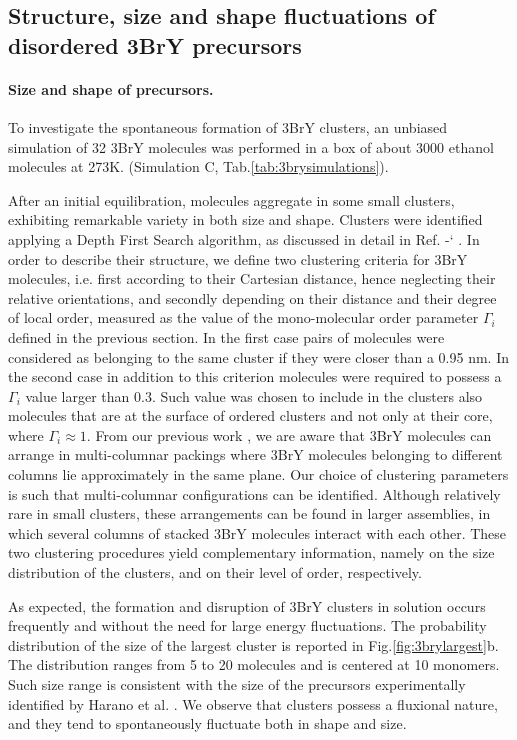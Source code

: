 \documentclass[journal=cgdefu,manuscript=article,layout=twocolumn]{achemso}
\newcommand*{\citen}[1]{%
  \begingroup
    \romannumeral-`\x %
    \setcitestyle{numbers}%
    \cite{#1}%
  \endgroup   
}
\begin{document}
\subsection{Structure, size and shape fluctuations of disordered 3BrY precursors}

\paragraph{Size and shape of precursors.}To investigate the spontaneous formation of 3BrY clusters, an unbiased simulation of 32 3BrY molecules was performed in a box of about 3000 ethanol molecules at 273K. (Simulation C, Tab.\ref{tab:3brysimulations}). 

After an initial equilibration, molecules aggregate in some small clusters, exhibiting remarkable variety in both size and shape. Clusters were identified applying a Depth First Search algorithm, as discussed in detail in Ref. \citen{tribello2017analyzing}. 
In order to describe their structure, we define two clustering criteria for 3BrY molecules, i.e. first according to their Cartesian distance, hence neglecting their relative orientations, and secondly depending on their distance and their degree of local order, measured as the value of the mono-molecular order parameter $\Gamma_i$ defined in the previous section. 
In the first case pairs of molecules were considered as belonging to the same cluster if they were closer than a 0.95 nm. In the second case in addition to this criterion molecules were required to possess a $\Gamma_i$ value larger than  0.3. Such value was chosen to include in the clusters also molecules that are at the surface of ordered clusters and not only at their core, where $\Gamma_i\approx 1$. 
From our previous work \cite{salvalaglio20141}, we are aware that 3BrY molecules can arrange in multi-columnar packings where 3BrY molecules belonging to different columns lie approximately in the same plane. Our choice of clustering parameters is such that multi-columnar configurations can be identified. Although relatively rare in small clusters,  these arrangements can be found in larger assemblies, in which several columns of stacked 3BrY molecules interact with each other.
These two clustering procedures yield complementary information, namely on the size distribution of the clusters, and on their level of order, respectively. 

As expected, the formation and disruption of 3BrY clusters in solution occurs frequently and without the need for large energy fluctuations.
The probability distribution of the size of the largest cluster is reported in Fig.\ref{fig:3brylargest}b. The distribution ranges from 5 to 20 molecules and is centered at 10 monomers. Such size range is consistent with the size of the precursors experimentally identified by Harano et al. \cite{harano2012heterogeneous}. We observe that clusters possess a fluxional nature, and they tend to spontaneously fluctuate both in shape and size.
\end{document}
